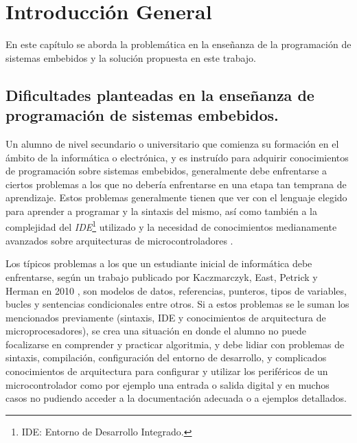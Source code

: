 
\chapter{Introducción General} %

\label{Chapter1} %
\label{IntroGeneral}


\newcommand{\keyword}[1]{\textbf{#1}}
\newcommand{\tabhead}[1]{\textbf{#1}}
\newcommand{\code}[1]{\texttt{#1}}
\newcommand{\file}[1]{\texttt{\bfseries#1}}
\newcommand{\option}[1]{\texttt{\itshape#1}}
\newcommand{\grados}{$^{\circ}$}


En este capítulo se aborda la problemática en la enseñanza de la programación de sistemas embebidos y la solución propuesta en este trabajo.

\section{Dificultades planteadas en la enseñanza de programación de sistemas embebidos.}

Un alumno de nivel secundario o universitario que comienza su formación en el ámbito de la informática o electrónica, y es instruído para adquirir conocimientos de programación sobre sistemas embebidos, generalmente debe enfrentarse a ciertos problemas a los que no debería enfrentarse en una etapa tan temprana de aprendizaje. Estos problemas generalmente tienen que ver con el lenguaje elegido para aprender a programar y la sintaxis del mismo, así como también a la complejidad del \textit{IDE}\footnote{IDE: Entorno de Desarrollo Integrado.} utilizado y la necesidad de conocimientos medianamente avanzados sobre arquitecturas de microcontroladores \cite{papereducacion5}. 

Los típicos problemas a los que un estudiante inicial de informática debe enfrentarse, según un trabajo publicado por Kaczmarczyk, East, Petrick y Herman en 2010 \cite{papereducacion2}, son modelos de datos, referencias, punteros, tipos de variables, bucles y sentencias condicionales entre otros. Si a estos problemas se le suman los mencionados previamente (sintaxis, IDE y conocimientos de arquitectura de microprocesadores), se crea una situación en donde el alumno no puede focalizarse en comprender y practicar algoritmia, y debe lidiar con problemas de sintaxis, compilación, configuración del entorno de desarrollo, y complicados conocimientos de arquitectura para configurar y utilizar los periféricos de un microcontrolador como por ejemplo una entrada o salida digital y en muchos casos no pudiendo acceder a la documentación adecuada o a ejemplos detallados. 

